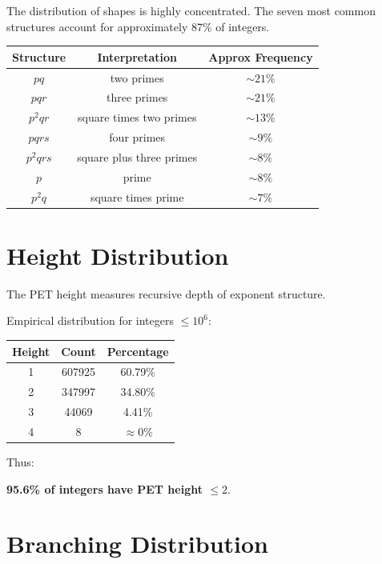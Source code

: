 \documentclass[11pt]{article}
\begin{document}
The distribution of shapes is highly concentrated.
The seven most common structures account for approximately 87\% of integers.

\begin{center}
\begin{tabular}{ccc}
\toprule
Structure & Interpretation & Approx Frequency \\
\midrule
$pq$ & two primes & $\sim21\%$ \\
$pqr$ & three primes & $\sim21\%$ \\
$p^2qr$ & square times two primes & $\sim13\%$ \\
$pqrs$ & four primes & $\sim9\%$ \\
$p^2qrs$ & square plus three primes & $\sim8\%$ \\
$p$ & prime & $\sim8\%$ \\
$p^2q$ & square times prime & $\sim7\%$ \\
\bottomrule
\end{tabular}
\end{center}

\section{Height Distribution}

The PET height measures recursive depth of exponent structure.

Empirical distribution for integers $\le 10^6$:

\begin{center}
\begin{tabular}{ccc}
\toprule
Height & Count & Percentage \\
\midrule
1 & 607925 & 60.79\% \\
2 & 347997 & 34.80\% \\
3 & 44069 & 4.41\% \\
4 & 8 & $\approx 0\%$ \\
\bottomrule
\end{tabular}
\end{center}

Thus:

\begin{center}
\textbf{95.6\% of integers have PET height $\le 2$}.
\end{center}

\section{Branching Distribution}
\end{document}
